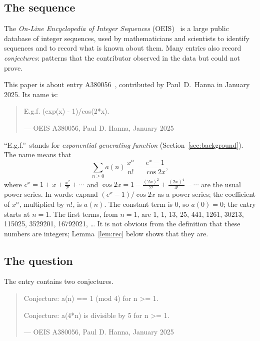 \documentclass[11pt,a4paper]{article}
\theoremstyle{definition}
\theoremstyle{remark}
\begin{document}
\subsection{The sequence}\label{sec:sequence}
The \emph{On-Line Encyclopedia of Integer Sequences} (OEIS)~\cite{oeisdb} is a large public database of integer
sequences, used by mathematicians and scientists to identify sequences and to record what is known about them. Many
entries also record \emph{conjectures}: patterns that the contributor observed in the data but could not prove.

This paper is about entry A380056~\cite{oeis}, contributed by Paul~D.~Hanna in January 2025. Its name is:
\begin{quote}\small\ttfamily\raggedright E.g.f. (exp(x) - 1)/cos(2*x).\par\smallskip\hfill\textrm{--- OEIS A380056, Paul D. Hanna, January 2025}\end{quote}

``E.g.f.''\ stands for \emph{exponential generating function} (Section~\ref{sec:background}). The name means that
\begin{equation}\label{eq:def}
\sum_{n\ge0}a(n)\,\frac{x^n}{n!}=\frac{e^x-1}{\cos 2x},
\end{equation}
where $e^x=1+x+\frac{x^2}{2!}+\cdots$ and $\cos2x=1-\frac{(2x)^2}{2!}+\frac{(2x)^4}{4!}-\cdots$ are the usual power series.
In words: expand $(e^x-1)/\cos2x$ as a power series; the coefficient of $x^n$, multiplied by $n!$, is $a(n)$. The
constant term is $0$, so $a(0)=0$; the entry starts at $n=1$. The first terms, from $n=1$, are
1, 1, 13, 25, 441, 1261, 30213, 115025, 3529201, 16792021, \dots{} It is not obvious from the definition that these numbers are
integers; Lemma~\ref{lem:rec} below shows that they are.

\subsection{The question}
The entry contains two conjectures.
\begin{quote}\small\ttfamily\raggedright Conjecture: a(n) == 1 (mod 4) for n >= 1.\par\smallskip Conjecture: a(4*n) is divisible by 5 for n >= 1.\par\smallskip\hfill\textrm{--- OEIS A380056, Paul D. Hanna, January 2025}\end{quote}
\end{document}

